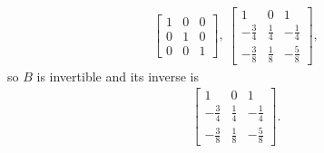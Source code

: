 \documentclass[12pt]{article}
\begin{document}
\begin{enumerate}
\begin{align*}
\begin{bmatrix}
        1 & 0 & 0\\
        0 & 1 & 0\\
        0 & 0 & 1
      \end{bmatrix},\
      \begin{bmatrix}
        1 & 0 & 1\\
        -\frac{3}{4} & \frac{1}{4} & -\frac{1}{4}\\
        -\frac{3}{8} & \frac{1}{8} & -\frac{5}{8}
      \end{bmatrix},
    \end{align*}
    so $B$ is invertible and its inverse is
    \begin{align*}
      \begin{bmatrix}
        1 & 0 & 1\\
        -\frac{3}{4} & \frac{1}{4} & -\frac{1}{4}\\
        -\frac{3}{8} & \frac{1}{8} & -\frac{5}{8}
      \end{bmatrix}.
    \end{align*}


\end{enumerate}
\end{document}
